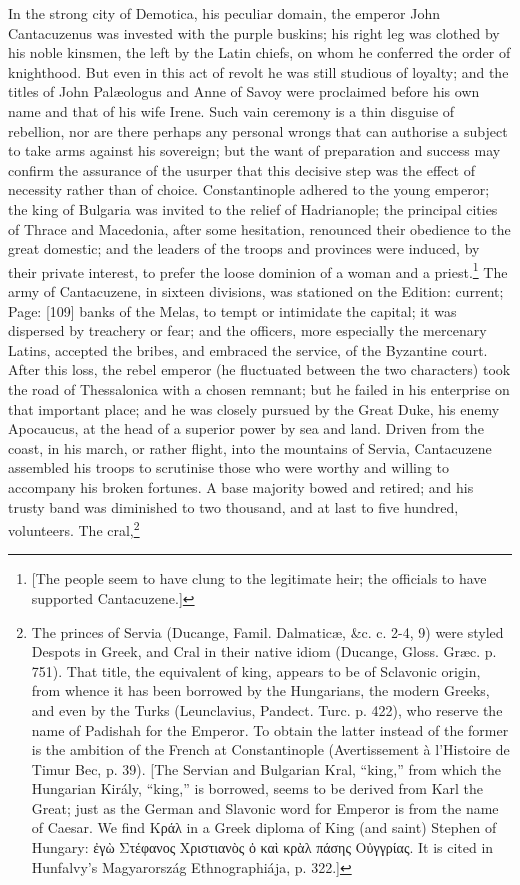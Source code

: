 In the strong city of Demotica, his peculiar domain, the emperor John Cantacuzenus was invested with the purple buskins; his right leg was clothed by his noble kinsmen, the left by the Latin chiefs, on whom he conferred the order of knighthood. But even in this act of revolt he was still studious of loyalty; and the titles of John Palæologus and Anne of Savoy were proclaimed before his own name and that of his wife Irene. Such vain ceremony is a thin disguise of rebellion, nor are there perhaps any personal wrongs that can authorise a subject to take arms against his sovereign; but the want of preparation and success may confirm the assurance of the usurper that this decisive step was the effect of necessity rather than of choice. Constantinople adhered to the young emperor; the king of Bulgaria was invited to the relief of Hadrianople; the principal cities of Thrace and Macedonia, after some hesitation, renounced their obedience to the great domestic; and the leaders of the troops and provinces were induced, by their private interest, to prefer the loose dominion of a woman and a priest.\footnote{[The people seem to have clung to the legitimate heir; the officials to have supported Cantacuzene.]} The army of Cantacuzene, in sixteen divisions, was stationed on the Edition: current; Page: [109] banks of the Melas, to tempt or intimidate the capital; it was dispersed by treachery or fear; and the officers, more especially the mercenary Latins, accepted the bribes, and embraced the service, of the Byzantine court. After this loss, the rebel emperor (he fluctuated between the two characters) took the road of Thessalonica with a chosen remnant; but he failed in his enterprise on that important place; and he was closely pursued by the Great Duke, his enemy Apocaucus, at the head of a superior power by sea and land. Driven from the coast, in his march, or rather flight, into the mountains of Servia, Cantacuzene assembled his troops to scrutinise those who were worthy and willing to accompany his broken fortunes. A base majority bowed and retired; and his trusty band was diminished to two thousand, and at last to five hundred, volunteers. The cral,\footnote{The princes of Servia (Ducange, Famil. Dalmaticæ, \&c. c. 2-4, 9) were styled Despots in Greek, and Cral in their native idiom (Ducange, Gloss. Græc. p. 751). That title, the equivalent of king, appears to be of Sclavonic origin, from whence it has been borrowed by the Hungarians, the modern Greeks, and even by the Turks (Leunclavius, Pandect. Turc. p. 422), who reserve the name of Padishah for the Emperor. To obtain the latter instead of the former is the ambition of the French at Constantinople (Avertissement à l\texthebrew{}’Histoire de Timur Bec, p. 39). [The Servian and Bulgarian Kral, \texthebrew{“}king,\texthebrew{}” from which the Hungarian Király, \texthebrew{“}king,\texthebrew{}” is borrowed, seems to be derived from Karl the Great; just as the German and Slavonic word for Emperor is from the name of Caesar. We find \textgreek{Κράλ} in a Greek diploma of King (and saint) Stephen of Hungary: \textgreek{\texthebrew{ἐ}γ\texthebrew{ὼ} Στέφανος Χριστιαν\texthebrew{ὸ}ς \texthebrew{ὀ} κα\texthebrew{ὶ} κρ\texthebrew{ὰ}λ πάσης Ο\texthebrew{ὐ}γγρίας}. It is cited in Hunfalvy\texthebrew{}’s Magyarország Ethnographiája, p. 322.]} 